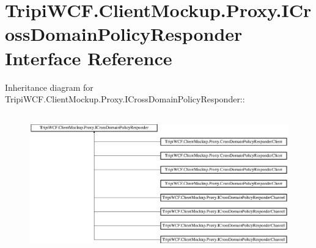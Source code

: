 \hypertarget{interface_tripi_w_c_f_1_1_client_mockup_1_1_proxy_1_1_i_cross_domain_policy_responder}{
\section{TripiWCF.ClientMockup.Proxy.ICrossDomainPolicyResponder Interface Reference}
\label{interface_tripi_w_c_f_1_1_client_mockup_1_1_proxy_1_1_i_cross_domain_policy_responder}
}
Inheritance diagram for TripiWCF.ClientMockup.Proxy.ICrossDomainPolicyResponder::\begin{figure}[H]
\begin{center}
\leavevmode
\includegraphics[height=6.05769cm]{interface_tripi_w_c_f_1_1_client_mockup_1_1_proxy_1_1_i_cross_domain_policy_responder}
\end{center}
\end{figure}
